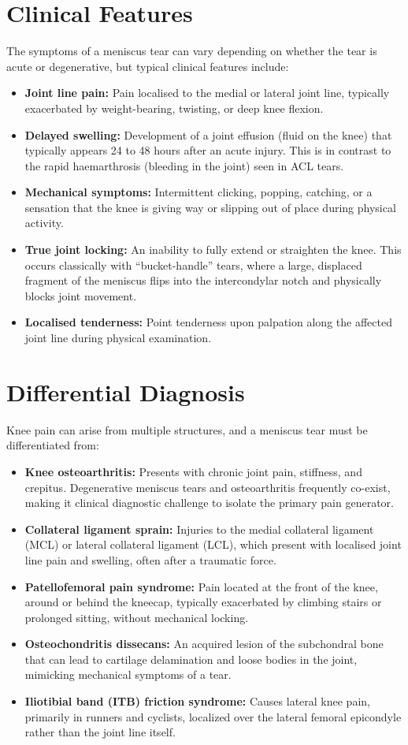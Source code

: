 \section*{Clinical Features}
The symptoms of a meniscus tear can vary depending on whether the tear is acute or degenerative, but typical clinical features include:
\begin{itemize}
    \item \textbf{Joint line pain:} Pain localised to the medial or lateral joint line, typically exacerbated by weight-bearing, twisting, or deep knee flexion.
    \item \textbf{Delayed swelling:} Development of a joint effusion (fluid on the knee) that typically appears 24 to 48 hours after an acute injury. This is in contrast to the rapid haemarthrosis (bleeding in the joint) seen in ACL tears.
    \item \textbf{Mechanical symptoms:} Intermittent clicking, popping, catching, or a sensation that the knee is giving way or slipping out of place during physical activity.
    \item \textbf{True joint locking:} An inability to fully extend or straighten the knee. This occurs classically with ``bucket-handle'' tears, where a large, displaced fragment of the meniscus flips into the intercondylar notch and physically blocks joint movement.
    \item \textbf{Localised tenderness:} Point tenderness upon palpation along the affected joint line during physical examination.
\end{itemize}

\section*{Differential Diagnosis}
Knee pain can arise from multiple structures, and a meniscus tear must be differentiated from:
\begin{itemize}
    \item \textbf{Knee osteoarthritis:} Presents with chronic joint pain, stiffness, and crepitus. Degenerative meniscus tears and osteoarthritis frequently co-exist, making it clinical diagnostic challenge to isolate the primary pain generator.
    \item \textbf{Collateral ligament sprain:} Injuries to the medial collateral ligament (MCL) or lateral collateral ligament (LCL), which present with localised joint line pain and swelling, often after a traumatic force.
    \item \textbf{Patellofemoral pain syndrome:} Pain located at the front of the knee, around or behind the kneecap, typically exacerbated by climbing stairs or prolonged sitting, without mechanical locking.
    \item \textbf{Osteochondritis dissecans:} An acquired lesion of the subchondral bone that can lead to cartilage delamination and loose bodies in the joint, mimicking mechanical symptoms of a tear.
    \item \textbf{Iliotibial band (ITB) friction syndrome:} Causes lateral knee pain, primarily in runners and cyclists, localized over the lateral femoral epicondyle rather than the joint line itself.
\end{itemize}

